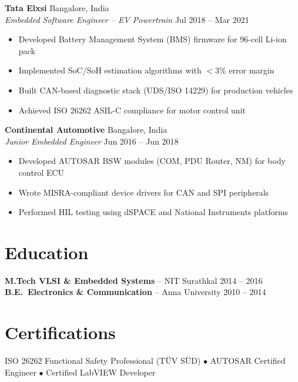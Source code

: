 \documentclass[10pt,letterpaper]{article}
\begin{document}
\textbf{Tata Elxsi} \hfill Bangalore, India\\
\textit{Embedded Software Engineer -- EV Powertrain} \hfill Jul 2018 -- Mar 2021
\begin{itemize}
\item Developed Battery Management System (BMS) firmware for 96-cell Li-ion pack
\item Implemented SoC/SoH estimation algorithms with $<$3\% error margin
\item Built CAN-based diagnostic stack (UDS/ISO 14229) for production vehicles
\item Achieved ISO 26262 ASIL-C compliance for motor control unit
\end{itemize}

\textbf{Continental Automotive} \hfill Bangalore, India\\
\textit{Junior Embedded Engineer} \hfill Jun 2016 -- Jun 2018
\begin{itemize}
\item Developed AUTOSAR BSW modules (COM, PDU Router, NM) for body control ECU
\item Wrote MISRA-compliant device drivers for CAN and SPI peripherals
\item Performed HIL testing using dSPACE and National Instruments platforms
\end{itemize}

\section{Education}
\textbf{M.Tech VLSI \& Embedded Systems} -- NIT Surathkal \hfill 2014 -- 2016\\
\textbf{B.E.\ Electronics \& Communication} -- Anna University \hfill 2010 -- 2014

\section{Certifications}
ISO 26262 Functional Safety Professional (T\"UV S\"UD) \quad $\bullet$ \quad AUTOSAR Certified Engineer \quad $\bullet$ \quad Certified LabVIEW Developer
\end{document}
